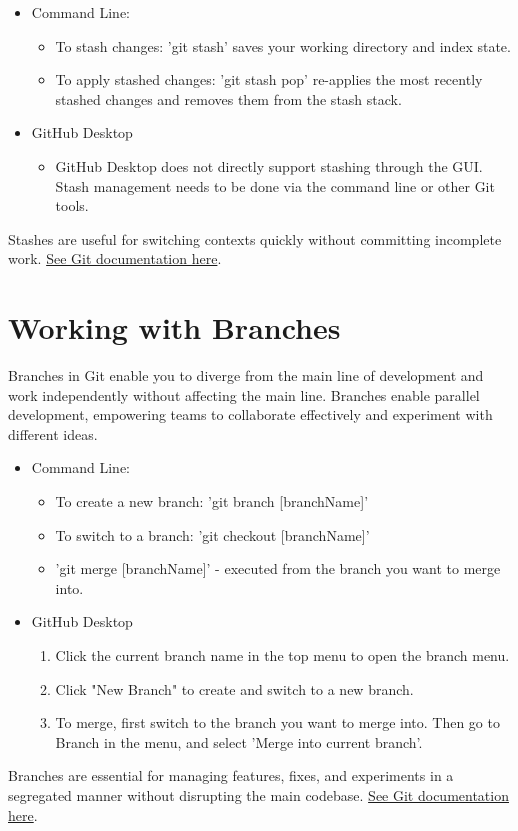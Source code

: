 \documentclass[10pt,twocolumn]{article}
\begin{document}
\begin{itemize}
    \item Command Line: 
    \begin{itemize}
        \item To stash changes: 'git stash' saves your working directory and index state.
        \item To apply stashed changes: 'git stash pop' re-applies the most recently stashed changes and removes them from the stash stack.
    \end{itemize}
    \item GitHub Desktop
    \begin{itemize}
        \item GitHub Desktop does not directly support stashing through the GUI. Stash management needs to be done via the command line or other Git tools.
    \end{itemize}
    
\end{itemize}

Stashes are useful for switching contexts quickly without committing incomplete work. \hyperlink{https://git-scm.com/docs/git-stash}{See Git documentation here}. \cite{GitPullDocumentation}

\section{Working with Branches}

Branches in Git enable you to diverge from the main line of development and work independently without affecting the main line. Branches enable parallel development, empowering teams to collaborate effectively and experiment with different ideas.

\begin{itemize}
    \item Command Line: 
    \begin{itemize}
        \item To create a new branch: 'git branch [branchName]'
        \item To switch to a branch: 'git checkout [branchName]'
        \item 'git merge [branchName]' - executed from the branch you want to merge into.
    \end{itemize}
    \item GitHub Desktop
    \begin{enumerate}
        \item Click the current branch name in the top menu to open the branch menu.
        \item Click "New Branch" to create and switch to a new branch.
        \item To merge, first switch to the branch you want to merge into. Then go to Branch in the menu, and select 'Merge into current branch'.
    \end{enumerate}
\end{itemize}
Branches are essential for managing features, fixes, and experiments in a segregated manner without disrupting the main codebase. \hyperlink{https://git-scm.com/docs/git-branch}{See Git documentation here}. \cite{GitBranchDocumentation}\cite{GitGuidesRemote}
\end{document}
